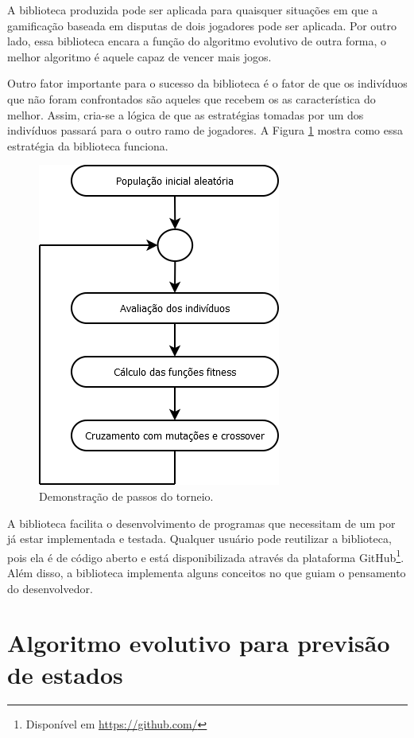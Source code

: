 A biblioteca produzida pode ser aplicada para quaisquer situações em que a gamificação baseada em disputas de dois jogadores pode ser aplicada. Por outro lado, essa biblioteca encara a função \fitness do algoritmo evolutivo de outra forma, o melhor algoritmo é aquele capaz de vencer mais jogos.

Outro fator importante para o sucesso da biblioteca é o fator de que os indivíduos que não foram confrontados são aqueles que recebem os as característica do melhor. Assim, cria-se a lógica de que as estratégias tomadas por um dos indivíduos passará para o outro ramo de jogadores. A Figura \ref{figura:ae_torneio_passos} mostra como essa estratégia da biblioteca funciona.

\begin{figure}[htb]
    \caption{Demonstração de passos do torneio.}
    \label{figura:ae_torneio_passos}
    \centering
    \includegraphics[scale=1]{images/dia/fluxograma-ae}
    \fautor
\end{figure}

A biblioteca facilita o desenvolvimento de programas que necessitam de um \SE por já estar implementada e testada. Qualquer usuário pode reutilizar a biblioteca, pois ela é de código aberto e está disponibilizada através da plataforma GitHub\footnote{Disponível em \url{https://github.com/}}. Além disso, a biblioteca implementa alguns conceitos no \SE que guiam o pensamento do desenvolvedor.

\section{Algoritmo evolutivo para previsão de estados}

